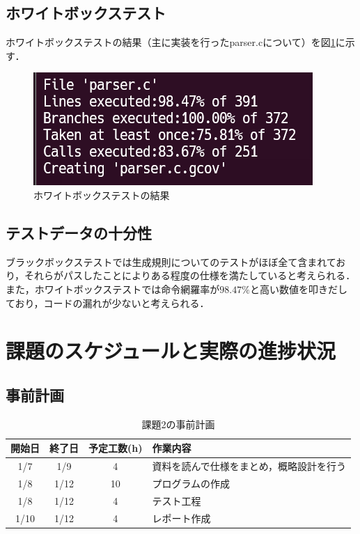 \documentclass{jlreq}
\begin{document}
\subsection{ホワイトボックステスト}
ホワイトボックステストの結果（主に実装を行ったparser.cについて）を図\ref{fig:white_box_test}に示す．
\begin{figure}[H]
  \centering
  \includegraphics[width=\textwidth]{assets/white_box_test.png}
  \caption{ホワイトボックステストの結果}
  \label{fig:white_box_test}
\end{figure}

\subsection{テストデータの十分性}
ブラックボックステストでは生成規則についてのテストがほぼ全て含まれており，それらがパスしたことによりある程度の仕様を満たしていると考えられる．
また，ホワイトボックステストでは命令網羅率が$98.47\%$と高い数値を叩きだしており，コードの漏れが少ないと考えられる．

\section{課題のスケジュールと実際の進捗状況}
\subsection{事前計画}
\begin{table}[H]
  \centering
  \caption{課題2の事前計画}
  \begin{tabular}{cccp{7cm}}
    \hline
    開始日 & 終了日 & 予定工数(h) & 作業内容                                 \\ \hline
    1/7    & 1/9    & 4           & 資料を読んで仕様をまとめ，概略設計を行う \\
    1/8    & 1/12   & 10          & プログラムの作成                         \\
    1/8    & 1/12   & 4           & テスト工程                               \\
    1/10   & 1/12   & 4           & レポート作成                             \\
    \hline
  \end{tabular}
\end{table}
\end{document}
